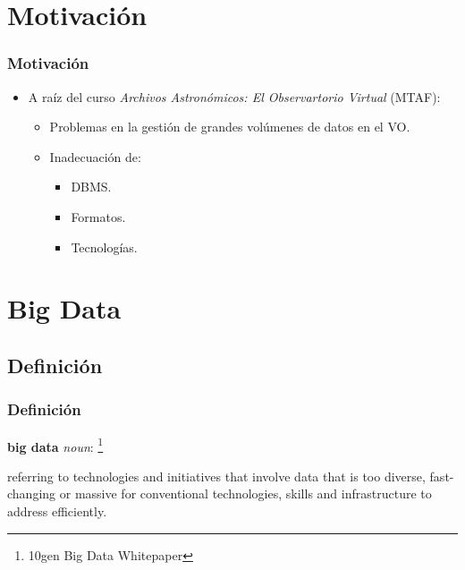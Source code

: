 \documentclass[serif,12pt]{beamer}
\begin{document}
\section{Motivación}
\begin{frame}
\frametitle{Motivación}


\begin{itemize}
\item A raíz del curso \emph{Archivos Astronómicos: El Observartorio Virtual} (MTAF):
  \begin{itemize}
  \item Problemas en la gestión de grandes volúmenes de datos en el VO.
  \item Inadecuación de:
    \begin{itemize}
    \item DBMS.
    \item Formatos.
    \item Tecnologías.
    \end{itemize}
  \end{itemize}
\end{itemize}

\end{frame}


\section{Big Data}

\subsection{Definición}
\begin{frame}
\frametitle{Definición}

\textbf{big data} \emph{noun}: \footnote{10gen Big Data Whitepaper}

\begin{shaded}

referring to technologies and initiatives that
involve data that is too diverse, fast-changing or
massive for conventional technologies, skills and
infrastructure to address efficiently.


\end{shaded}
\end{frame}
\end{document}
